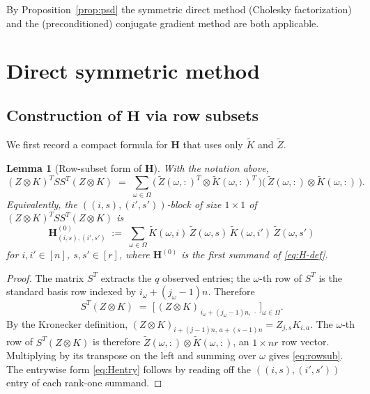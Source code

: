 \documentclass[12pt]{article}
\newtheorem{lemma}[theorem]{Lemma}
\theoremstyle{definition}
\newcommand{\Kt}{\widetilde{K}}
\newcommand{\Zt}{\widetilde{Z}}
\begin{document}
By Proposition~\ref{prop:psd} the symmetric direct method (Cholesky factorization) and the
(preconditioned) conjugate gradient method are both applicable.

\section{Direct symmetric method}\label{sec:direct}

\subsection{Construction of $\mathbf{H}$ via row subsets}

We first record a compact formula for $\mathbf{H}$ that uses only $\Kt$ and $\Zt$.

\begin{lemma}[Row-subset form of $\mathbf{H}$]\label{lem:rowsubset}
With the notation above,
\begin{equation}\label{eq:rowsub}
(Z\otimes K)^T SS^T (Z\otimes K) \;=\; \sum_{\omega\in\Omega}
\bigl(\,\Zt(\omega,:)^T \otimes \Kt(\omega,:)^T\,\bigr)\bigl(\,\Zt(\omega,:)\otimes \Kt(\omega,:)\,\bigr).
\end{equation}
Equivalently, the $((i,s),(i',s'))$-block of size $1\times 1$ of $(Z\otimes K)^TSS^T(Z\otimes K)$
is
\begin{equation}\label{eq:Hentry}
\mathbf{H}^{(0)}_{(i,s),(i',s')} \;:=\; \sum_{\omega\in\Omega} \Kt(\omega,i)\,\Zt(\omega,s)\,\Kt(\omega,i')\,\Zt(\omega,s')
\end{equation}
for $i,i'\in[n]$, $s,s'\in[r]$, where $\mathbf{H}^{(0)}$ is the first summand of \eqref{eq:H-def}.
\end{lemma}

\begin{proof}
The matrix $S^T$ extracts the $q$ observed entries; the $\omega$-th row of $S^T$ is the standard
basis row indexed by $i_\omega+(j_\omega-1)n$. Therefore
\[
S^T(Z\otimes K)
\;=\;
\bigl[\,(Z\otimes K)_{\,i_\omega+(j_\omega-1)n,\,\cdot}\,\bigr]_{\omega\in\Omega}.
\]
By the Kronecker definition, $(Z\otimes K)_{i+(j-1)n,\,a+(s-1)n}=Z_{j,s}K_{i,a}$. The
$\omega$-th row of $S^T(Z\otimes K)$ is therefore
$\Zt(\omega,:)\otimes \Kt(\omega,:)$, an $1\times nr$ row vector. Multiplying by its transpose
on the left and summing over $\omega$ gives \eqref{eq:rowsub}. The entrywise form
\eqref{eq:Hentry} follows by reading off the $((i,s),(i',s'))$ entry of each rank-one summand.
\end{proof}
\end{document}
